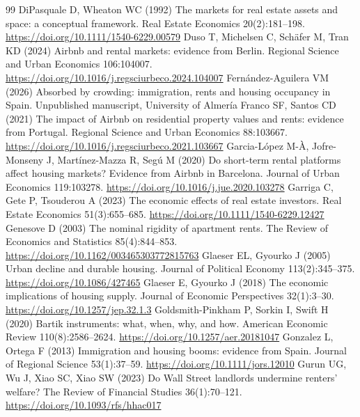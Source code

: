 \begin{thebibliography}{99}
 DiPasquale D, Wheaton WC (1992) The markets for real estate assets and space: a conceptual framework. Real Estate Economics 20(2):181--198. \url{https://doi.org/10.1111/1540-6229.00579}
 Duso T, Michelsen C, Schäfer M, Tran KD (2024) Airbnb and rental markets: evidence from Berlin. Regional Science and Urban Economics 106:104007. \url{https://doi.org/10.1016/j.regsciurbeco.2024.104007}
 Fernández-Aguilera VM (2026) Absorbed by crowding: immigration, rents and housing occupancy in Spain. Unpublished manuscript, University of Almería
 Franco SF, Santos CD (2021) The impact of Airbnb on residential property values and rents: evidence from Portugal. Regional Science and Urban Economics 88:103667. \url{https://doi.org/10.1016/j.regsciurbeco.2021.103667}
 Garcia-López M-À, Jofre-Monseny J, Martínez-Mazza R, Segú M (2020) Do short-term rental platforms affect housing markets? Evidence from Airbnb in Barcelona. Journal of Urban Economics 119:103278. \url{https://doi.org/10.1016/j.jue.2020.103278}
 Garriga C, Gete P, Tsouderou A (2023) The economic effects of real estate investors. Real Estate Economics 51(3):655--685. \url{https://doi.org/10.1111/1540-6229.12427}
 Genesove D (2003) The nominal rigidity of apartment rents. The Review of Economics and Statistics 85(4):844--853. \url{https://doi.org/10.1162/003465303772815763}
 Glaeser EL, Gyourko J (2005) Urban decline and durable housing. Journal of Political Economy 113(2):345--375. \url{https://doi.org/10.1086/427465}
 Glaeser E, Gyourko J (2018) The economic implications of housing supply. Journal of Economic Perspectives 32(1):3--30. \url{https://doi.org/10.1257/jep.32.1.3}
 Goldsmith-Pinkham P, Sorkin I, Swift H (2020) Bartik instruments: what, when, why, and how. American Economic Review 110(8):2586--2624. \url{https://doi.org/10.1257/aer.20181047}
 Gonzalez L, Ortega F (2013) Immigration and housing booms: evidence from Spain. Journal of Regional Science 53(1):37--59. \url{https://doi.org/10.1111/jors.12010}
 Gurun UG, Wu J, Xiao SC, Xiao SW (2023) Do Wall Street landlords undermine renters' welfare? The Review of Financial Studies 36(1):70--121. \url{https://doi.org/10.1093/rfs/hhac017}

\end{thebibliography}
